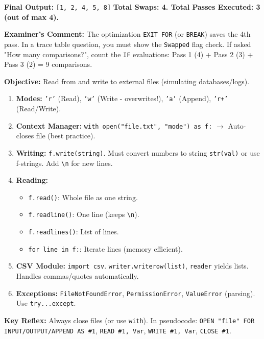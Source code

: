 \documentclass[11pt]{article}
\begin{document}
\begin{exoresolu}
\noindent\textbf{Final Output:} \texttt{[1, 2, 4, 5, 8]}
\textbf{Total Swaps: 4. Total Passes Executed: 3 (out of max 4).}

\noindent\textbf{Examiner's Comment:} The optimization \texttt{EXIT FOR} (or \texttt{BREAK}) saves the 4th pass. In a trace table question, you must show the \texttt{Swapped} flag check. If asked "How many comparisons?", count the \texttt{IF} evaluations: Pass 1 (4) + Pass 2 (3) + Pass 3 (2) = 9 comparisons.
\end{exoresolu}

\begin{methode}
\textbf{Objective:} Read from and write to external files (simulating databases/logs).
\begin{enumerate}
    \item \textbf{Modes:} \texttt{'r'} (Read), \texttt{'w'} (Write - overwrites!), \texttt{'a'} (Append), \texttt{'r+'} (Read/Write).
    \item \textbf{Context Manager:} \texttt{with open("file.txt", "mode") as f:} $\rightarrow$ Auto-closes file (best practice).
    \item \textbf{Writing:} \texttt{f.write(string)}. Must convert numbers to string \texttt{str(val)} or use f-strings. Add \texttt{\textbackslash n} for new lines.
    \item \textbf{Reading:}
        \begin{itemize}
            \item \texttt{f.read()}: Whole file as one string.
            \item \texttt{f.readline()}: One line (keeps \texttt{\textbackslash n}).
            \item \texttt{f.readlines()}: List of lines.
            \item \texttt{for line in f:}: Iterate lines (memory efficient).
        \end{itemize}
    \item \textbf{CSV Module:} \texttt{import csv}. \texttt{writer.writerow(list)}, \texttt{reader} yields lists. Handles commas/quotes automatically.
    \item \textbf{Exceptions:} \texttt{FileNotFoundError}, \texttt{PermissionError}, \texttt{ValueError} (parsing). Use \texttt{try...except}.
\end{enumerate}
\textbf{Key Reflex:} Always close files (or use \texttt{with}). In pseudocode: \texttt{OPEN "file" FOR INPUT/OUTPUT/APPEND AS \#1}, \texttt{READ \#1, Var}, \texttt{WRITE \#1, Var}, \texttt{CLOSE \#1}.
\end{methode}
\end{document}
